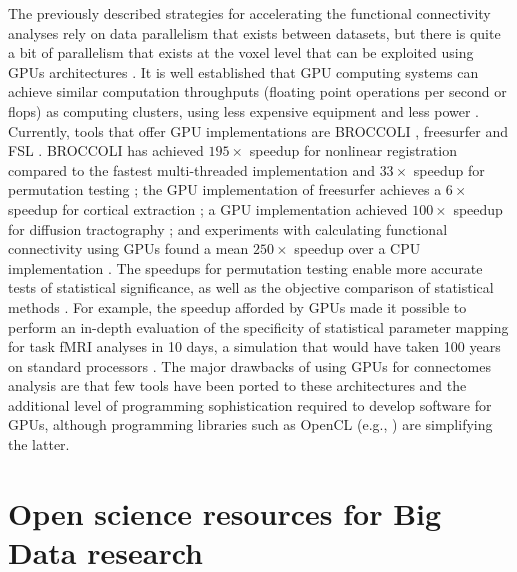 \documentclass{bmcart}
\begin{document}
The previously described strategies for accelerating the functional connectivity analyses rely on data parallelism that exists between datasets, but there is quite a bit of parallelism that exists at the voxel level that can be exploited using GPUs architectures \cite{Eklund2012a}. It is well established that GPU computing systems can achieve similar computation throughputs (floating point operations per second or flops) as computing clusters, using less expensive equipment and less power \cite{Eklund2012a,Hernandez2013}. Currently, tools that offer GPU implementations are BROCCOLI \cite{eklund2014broccoli}, freesurfer \cite{delgado2014} and FSL \cite{Hernandez2013dti}. BROCCOLI has achieved $195\times$ speedup for nonlinear registration compared to the fastest multi-threaded implementation and $33\times$ speedup for permutation testing \cite{Eklund2013}; the GPU implementation of freesurfer achieves a $6\times$ speedup for cortical extraction \cite{delgado2014}; a GPU implementation achieved $100 \times$ speedup for diffusion tractography \cite{Hernandez2013dti}; and experiments with calculating functional connectivity using GPUs found a mean $250\times$ speedup over a CPU implementation \cite{Eklund2011b}. The speedups for permutation testing enable more accurate tests of statistical significance, as well as the objective comparison of statistical methods \cite{Eklund2011}. For example, the speedup afforded by GPUs made it possible to perform an in-depth evaluation of the specificity of statistical parameter mapping for task fMRI analyses in 10 days, a simulation that would have taken 100 years on standard processors \cite{Eklund2012}.  The major drawbacks of using GPUs for connectomes analysis are that few tools have been ported to these architectures and the additional level of programming sophistication required to develop software for GPUs, although programming libraries such as OpenCL (e.g., \cite{Munshi2011}) are simplifying the latter.

\section{Open science resources for Big Data research}
\end{document}
